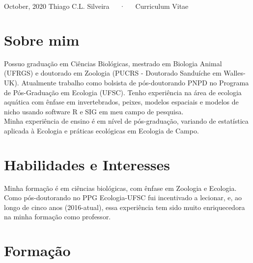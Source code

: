 \documentclass[11pt, a4paper]{awesome-cv}
\begin{document}
\makecvheader

\makecvfooter
  {October, 2020}
    {Thiago C.L. Silveira~~~·~~~Curriculum Vitae}
  {\thepage}





\section{Sobre mim}\label{sobre-mim}

Possuo graduação em Ciências Biológicas, mestrado em Biologia Animal
(UFRGS) e doutorado em Zoologia (PUCRS - Doutorado Sanduíche em
Walles-UK). Atualmente trabalho como bolsista de pós-doutorando PNPD no
Programa de Pós-Graduação em Ecologia (UFSC). Tenho experiência na área
de ecologia aquática com ênfase em invertebrados, peixes, modelos
espaciais e modelos de nicho usando software R e SIG em meu campo de
pesquisa.\\
Minha experiência de ensino é em nível de pós-graduação, variando de
estatística aplicada à Ecologia e práticas ecológicas em Ecologia de
Campo.

\section{Habilidades e Interesses}\label{habilidades-e-interesses}

Minha formação é em ciências biológicas, com ênfase em Zoologia e
Ecologia. Como pós-doutorando no PPG Ecologia-UFSC fui incentivado a
lecionar, e, ao longo de cinco anos (2016-atual), essa experiência tem
sido muito enriquecedora na minha formação como professor.

\section{Formação}\label{formauxe7uxe3o}
\end{document}
